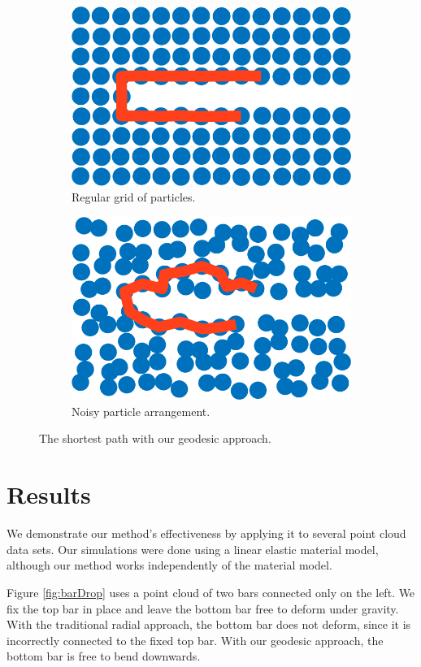 \documentclass[11pt,a4paper, final, twoside]{article}
\theoremstyle{proposition}
\theoremstyle{definition}
\theoremstyle{remark}
\numberwithin{equation}{section}
\begin{document}
\begin{figure}[h]
\centering
\begin{subfigure}[t]{.5\textwidth}
  \centering
  \includegraphics[width=.7\linewidth]{geodesicLineGrid.png}
  \caption{Regular grid of particles.}
\end{subfigure}%
\begin{subfigure}[t]{.5\textwidth}
  \centering
  \includegraphics[width=.7\linewidth]{geodesicLine.png}
  \caption{Noisy particle arrangement.}
\end{subfigure}
\caption{The shortest path with our geodesic approach.}
\label{fig:geoWalk}
\end{figure}


\section{Results}


We demonstrate our method's effectiveness by applying it to several point cloud data sets. Our simulations were done using a linear elastic material model, although our method works independently of the material model.

Figure \ref{fig:barDrop} uses a point cloud of two bars connected only on the left. We fix the top bar in place and leave the bottom bar free to deform under gravity. With the traditional radial approach, the bottom bar does not deform, since it is incorrectly connected to the fixed top bar. With our geodesic approach, the bottom bar is free to bend downwards.
\end{document}
